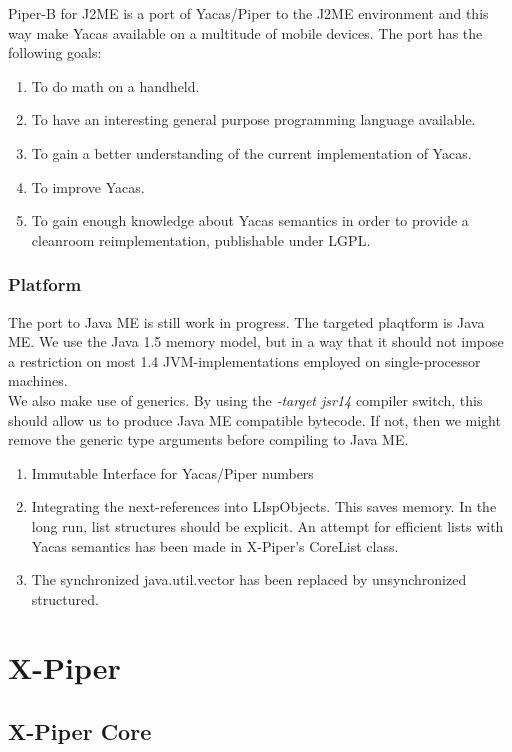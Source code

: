 Piper-B for J2ME is a port of Yacas/Piper to the J2ME environment and this way
make Yacas available on a multitude of mobile devices. The port has the
following goals:
\begin{enumerate}
\item To do math on a handheld.
\item To have an interesting general purpose programming language available.
\item To gain a better understanding of the current implementation of Yacas.
\item To improve Yacas.
\item To gain enough knowledge about Yacas semantics in order to provide
a cleanroom reimplementation, publishable under LGPL.
\end{enumerate}

\subsection{Platform}

The port to Java ME is still work in progress. The targeted plaqtform
is Java ME. We use the Java 1.5 memory model, but in a way that it
should not impose a restriction on most 1.4 JVM-implementations employed
on single-processor machines.\\
We also make use of generics. By using the {\em -target jsr14} compiler
switch, this should allow us to produce Java ME compatible bytecode.
If not, then we might remove the generic type arguments before compiling
to Java ME.

\begin{enumerate}
\item Immutable Interface for Yacas/Piper numbers
\item Integrating the next-references into LIspObjects. This saves memory.
In the long run, list structures should be explicit. An attempt for
efficient lists with Yacas semantics has been made in X-Piper's CoreList class.
\item The synchronized java.util.vector has been replaced by unsynchronized
structured.
\end{enumerate}


\chapter{X-Piper}

\section{X-Piper Core}

